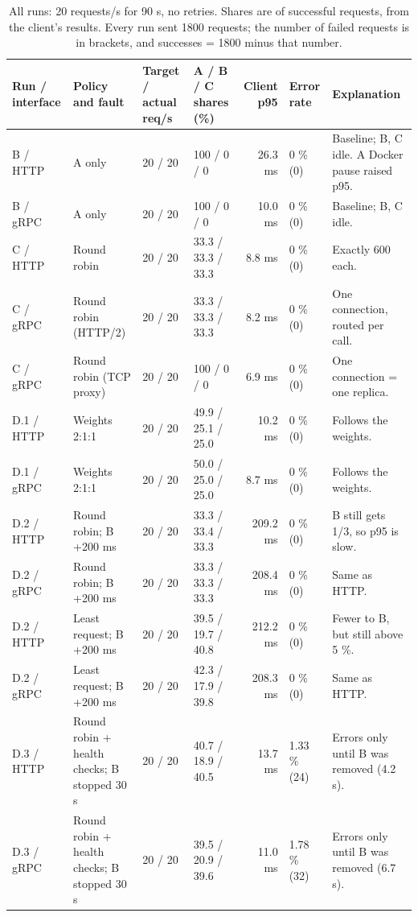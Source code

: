 \documentclass[10pt,a4paper]{article}
\begin{document}
\begin{table}[H]
\centering\scriptsize
\setlength{\tabcolsep}{3pt}
\begin{tabularx}{\textwidth}{@{}L{1.75cm} L{2.7cm} C{1.3cm} C{2.1cm} r L{1.45cm} Y@{}}
\toprule
Run / interface & Policy and fault & Target / actual req/s & A / B / C shares (\%) & Client p95 & Error rate & Explanation \\
\midrule
B / HTTP & A only & 20 / 20 & 100 / 0 / 0 & 26.3 ms & 0 \% (0) & Baseline; B, C idle. A Docker pause raised p95. \\
B / gRPC & A only & 20 / 20 & 100 / 0 / 0 & 10.0 ms & 0 \% (0) & Baseline; B, C idle. \\
C / HTTP & Round robin & 20 / 20 & 33.3 / 33.3 / 33.3 & 8.8 ms & 0 \% (0) & Exactly 600 each. \\
C / gRPC & Round robin (HTTP/2) & 20 / 20 & 33.3 / 33.3 / 33.3 & 8.2 ms & 0 \% (0) & One connection, routed per call. \\
C / gRPC & Round robin (TCP proxy) & 20 / 20 & 100 / 0 / 0 & 6.9 ms & 0 \% (0) & One connection = one replica. \\
D.1 / HTTP & Weights 2:1:1 & 20 / 20 & 49.9 / 25.1 / 25.0 & 10.2 ms & 0 \% (0) & Follows the weights. \\
D.1 / gRPC & Weights 2:1:1 & 20 / 20 & 50.0 / 25.0 / 25.0 & 8.7 ms & 0 \% (0) & Follows the weights. \\
D.2 / HTTP & Round robin; B +200 ms & 20 / 20 & 33.3 / 33.4 / 33.3 & 209.2 ms & 0 \% (0) & B still gets 1/3, so p95 is slow. \\
D.2 / gRPC & Round robin; B +200 ms & 20 / 20 & 33.3 / 33.3 / 33.3 & 208.4 ms & 0 \% (0) & Same as HTTP. \\
D.2 / HTTP & Least request; B +200 ms & 20 / 20 & 39.5 / 19.7 / 40.8 & 212.2 ms & 0 \% (0) & Fewer to B, but still above 5 \%. \\
D.2 / gRPC & Least request; B +200 ms & 20 / 20 & 42.3 / 17.9 / 39.8 & 208.3 ms & 0 \% (0) & Same as HTTP. \\
D.3 / HTTP & Round robin + health checks; B stopped 30 s & 20 / 20 & 40.7 / 18.9 / 40.5 & 13.7 ms & 1.33 \% (24) & Errors only until B was removed (4.2 s). \\
D.3 / gRPC & Round robin + health checks; B stopped 30 s & 20 / 20 & 39.5 / 20.9 / 39.6 & 11.0 ms & 1.78 \% (32) & Errors only until B was removed (6.7 s). \\
\bottomrule
\end{tabularx}
\caption{All runs: 20 requests/s for 90 s, no retries. Shares are of successful requests, from the client's results.
Every run sent 1800 requests; the number of failed requests is in brackets, and successes = 1800 minus that number.}
\label{tab:results}
\end{table}
\end{document}
